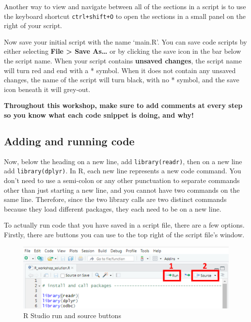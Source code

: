 \documentclass[
  12pt,
]{article}
\begin{document}
Another way to view and navigate between all of the sections in a script
is to use the keyboard shortcut \texttt{ctrl+shift+O} to open the
sections in a small panel on the right of your script.

Now save your initial script with the name `main.R'. You can save code
scripts by either selecting \textbf{File \textgreater{} Save As\ldots{}}
or by clicking the save icon in the bar below the script name. When your
script contains \textbf{unsaved changes}, the script name will turn red
and end with a * symbol. When it does not contain any unsaved changes,
the name of the script will turn black, with no * symbol, and the save
icon beneath it will grey-out.

\textbf{Throughout this workshop, make sure to add comments at every
step so you know what each code snippet is doing, and why!}

\hypertarget{adding-and-running-code}{%
\subsection{Adding and running code}\label{adding-and-running-code}}

Now, below the heading on a new line, add \texttt{library(readr)}, then
on a new line add \texttt{library(dplyr)}. In R, each new line
represents a new code command. You don't need to use a semi-colon or any
other punctuation to separate commands other than just starting a new
line, and you cannot have two commands on the same line. Therefore,
since the two library calls are two distinct commands because they load
different packages, they each need to be on a new line.

To actually run code that you have saved in a script file, there are a
few options. Firstly, there are buttons you can use to the top right of
the script file's window.

\begin{figure}
\includegraphics[width=1\linewidth]{images/RforRAP/run_buttons} \caption{R Studio run and source buttons}\label{fig:unnamed-chunk-5}
\end{figure}
\end{document}
